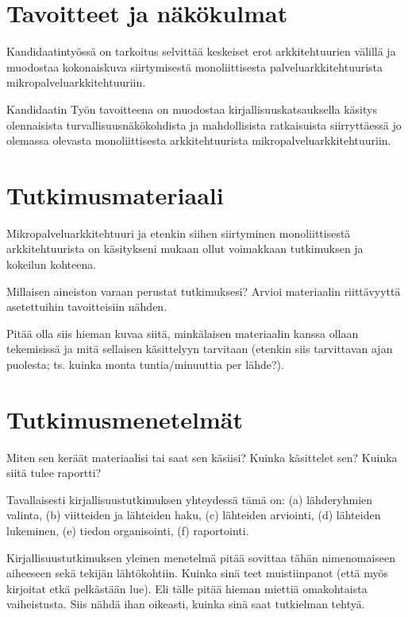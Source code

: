 \documentclass[12pt,a4paper,finnish,oneside]{article}
\begin{document}
\section{Tavoitteet ja näkökulmat}

Kandidaatintyössä on tarkoitus selvittää keskeiset erot arkkitehtuurien välillä ja muodostaa kokonaiskuva 
siirtymisestä monoliittisesta palveluarkkitehtuurista mikropalveluarkkitehtuuriin.

Kandidaatin Työn tavoitteena on muodostaa kirjallisuuskatsauksella käsitys olennaisista turvallisuusnäkökohdista 
ja mahdollisista ratkaisuista siirryttäessä jo olemassa olevasta monoliittisesta arkkitehtuurista mikropalveluarkkitehtuuriin.

\section{Tutkimusmateriaali}

Mikropalveluarkkitehtuuri ja etenkin siihen siirtyminen monoliittisestä arkkitehtuurista on 
käsitykseni mukaan ollut voimakkaan tutkimuksen ja kokeilun kohteena.


Millaisen aineiston varaan perustat tutkimuksesi? Arvioi materiaalin
riittävyyttä asetettuihin tavoitteisiin nähden.

Pitää olla siis hieman kuvaa siitä, minkälaisen materiaalin kanssa
ollaan tekemisissä ja mitä sellaisen käsittelyyn tarvitaan (etenkin
siis tarvittavan ajan puolesta; ts. kuinka monta tuntia/minuuttia per
lähde?).

\section{Tutkimusmenetelmät}


Miten sen keräät materiaalisi tai saat sen käsiisi? Kuinka käsittelet
sen? Kuinka siitä tulee raportti?

Tavallaisesti kirjallisuustutkimuksen yhteydessä tämä on:
(a) lähderyhmien valinta,
(b) viitteiden ja lähteiden haku,
(c) lähteiden arviointi,
(d) lähteiden lukeminen,
(e) tiedon organisointi,
(f) raportointi.  %

Kirjallisuustutkimuksen yleinen menetelmä pitää sovittaa tähän
nimenomaiseen aiheeseen sekä tekijän lähtökohtiin. Kuinka sinä teet
muistiinpanot (että myös kirjoitat etkä pelkästään lue). Eli tälle
pitää hieman miettiä omakohtaista vaiheistusta. Siis nähdä ihan
oikeasti, kuinka sinä saat tutkielman tehtyä.
\end{document}
